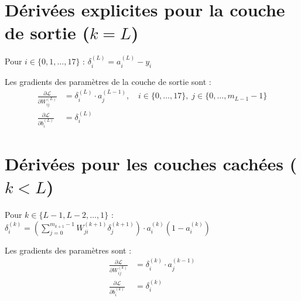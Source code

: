\documentclass[12pt,a4paper]{report}
\numberwithin{equation}{section}
\begin{document}
\section{Dérivées explicites pour la couche de sortie ($k = L$)}

\begin{theorem}
Pour $i \in \{0, 1, \ldots, 17\}$ :
$\delta^{(L)}_i = a^{(L)}_i - y_i$

Les gradients des paramètres de la couche de sortie sont :
\begin{align}
\frac{\partial \mathcal{L}}{\partial W^{(L)}_{ij}} &= \delta^{(L)}_i \cdot a^{(L-1)}_j, \quad i \in \{0, \ldots, 17\}, \; j \in \{0, \ldots, m_{L-1}-1\}\\
\frac{\partial \mathcal{L}}{\partial b^{(L)}_i} &= \delta^{(L)}_i
\end{align}
\end{theorem}

\section{Dérivées pour les couches cachées ($k < L$)}

\begin{theorem}
Pour $k \in \{L-1, L-2, \ldots, 1\}$ :
$\delta^{(k)}_i = \left(\sum_{j=0}^{m_{k+1}-1} W^{(k+1)}_{ji} \delta^{(k+1)}_j\right) \cdot a^{(k)}_i (1 - a^{(k)}_i)$

Les gradients des paramètres sont :
\begin{align}
\frac{\partial \mathcal{L}}{\partial W^{(k)}_{ij}} &= \delta^{(k)}_i \cdot a^{(k-1)}_j\\
\frac{\partial \mathcal{L}}{\partial b^{(k)}_i} &= \delta^{(k)}_i
\end{align}
\end{theorem}


\end{document}
